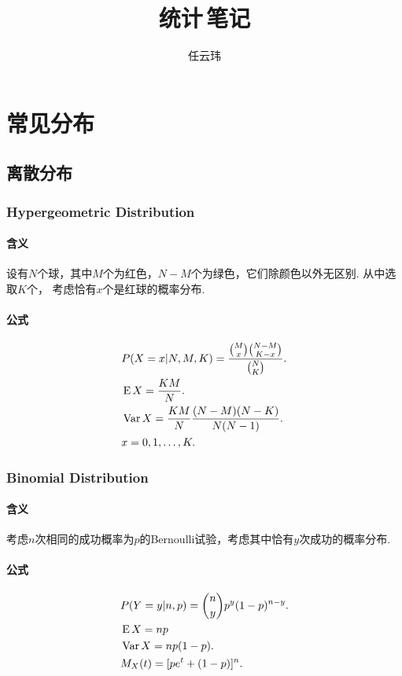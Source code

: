 

\title{统计$\,$笔记}
\author{任云玮}
\date{}


\maketitle
\tableofcontents

\newpage
\section{常见分布}
\subsection{离散分布}
  \subsubsection{Hypergeometric Distribution}
    \paragraph{含义}
      设有$N$个球，其中$M$个为红色，$N-M$个为绿色，它们除颜色以外无区别. 从中选取$K$个，
      考虑恰有$x$个是红球的概率分布. 
    \paragraph{公式}
      \begin{align*}
        &P(X=x|N,M,K) = \frac{\binom{M}{x}\binom{N-M}{K-x}}{\binom{N}{K}}.\\
        &\operatorname{E} X = \frac{KM}{N}. \\
        &\operatorname{Var} X = \frac{KM}{N}\frac{(N-M)(N-K)}{N(N-1)}.\\
        &x = 0,1,\dots,K.
      \end{align*}
  \subsubsection{Binomial Distribution}
    \paragraph{含义}
    考虑$n$次相同的成功概率为$p$的Bernoulli试验，考虑其中恰有$y$次成功的概率分布. 
    \paragraph{公式}
    \begin{align*}
      & P(Y=y|n,p)=\binom{n}{y}p^y(1-p)^{n-y}. \\
      & \operatorname{E} X = np \\
      & \operatorname{Var} X = np(1-p). \\
      & M_X(t) = [pe^t + (1-p)]^n.
    \end{align*}

